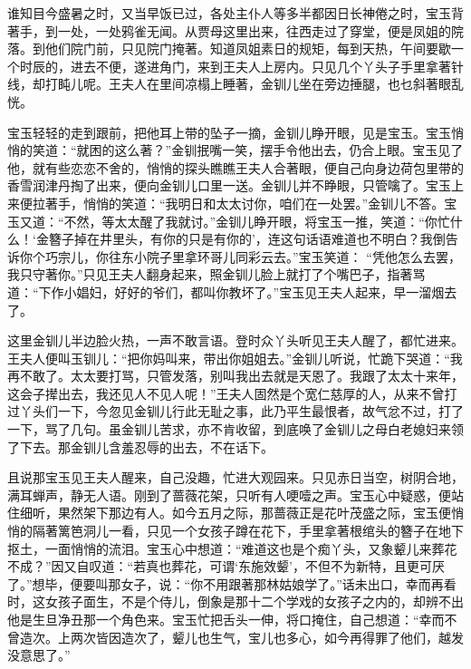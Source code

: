 \begin{parag}


    谁知目今盛暑之时，又当早饭已过，各处主仆人等多半都因日长神倦之时，宝玉背著手，到一处，一处鸦雀无闻。从贾母这里出来，往西走过了穿堂，便是凤姐的院落。到他们院门前，只见院门掩著。知道凤姐素日的规矩，每到天热，午间要歇一个时辰的，进去不便，遂进角门，来到王夫人上房内。只见几个丫头子手里拿著针线，却打盹儿呢。王夫人在里间凉榻上睡著，金钏儿坐在旁边捶腿，也乜斜著眼乱恍。
\end{parag}


\begin{parag}


    宝玉轻轻的走到跟前，把他耳上带的坠子一摘，金钏儿睁开眼，见是宝玉。宝玉悄悄的笑道：“就困的这么著？”金钏抿嘴一笑，摆手令他出去，仍合上眼。宝玉见了他，就有些恋恋不舍的，悄悄的探头瞧瞧王夫人合著眼，便自己向身边荷包里带的香雪润津丹掏了出来，便向金钏儿口里一送。金钏儿并不睁眼，只管噙了。宝玉上来便拉著手，悄悄的笑道：“我明日和太太讨你，咱们在一处罢。”金钏儿不答。宝玉又道：“不然，等太太醒了我就讨。”金钏儿睁开眼，将宝玉一推，笑道：“你忙什么！‘金簪子掉在井里头，有你的只是有你的’，连这句话语难道也不明白？我倒告诉你个巧宗儿，你往东小院子里拿环哥儿同彩云去。”宝玉笑道： “凭他怎么去罢，我只守著你。”只见王夫人翻身起来，照金钏儿脸上就打了个嘴巴子，指著骂道：“下作小娼妇，好好的爷们，都叫你教坏了。”宝玉见王夫人起来，早一溜烟去了。
\end{parag}


\begin{parag}


    这里金钏儿半边脸火热，一声不敢言语。登时众丫头听见王夫人醒了，都忙进来。王夫人便叫玉钏儿：“把你妈叫来，带出你姐姐去。”金钏儿听说，忙跪下哭道：“我再不敢了。太太要打骂，只管发落，别叫我出去就是天恩了。我跟了太太十来年，这会子撵出去，我还见人不见人呢！”王夫人固然是个宽仁慈厚的人，从来不曾打过丫头们一下，今忽见金钏儿行此无耻之事，此乃平生最恨者，故气忿不过，打了一下，骂了几句。虽金钏儿苦求，亦不肯收留，到底唤了金钏儿之母白老媳妇来领了下去。那金钏儿含羞忍辱的出去，不在话下。
\end{parag}


\begin{parag}


    且说那宝玉见王夫人醒来，自己没趣，忙进大观园来。只见赤日当空，树阴合地，满耳蝉声，静无人语。刚到了蔷薇花架，只听有人哽噎之声。宝玉心中疑惑，便站住细听，果然架下那边有人。如今五月之际，那蔷薇正是花叶茂盛之际，宝玉便悄悄的隔著篱笆洞儿一看，只见一个女孩子蹲在花下，手里拿著根绾头的簪子在地下抠土，一面悄悄的流泪。宝玉心中想道：“难道这也是个痴丫头，又象颦儿来葬花不成？”因又自叹道：“若真也葬花，可谓‘东施效颦’，不但不为新特，且更可厌了。”想毕，便要叫那女子，说：“你不用跟著那林姑娘学了。”话未出口，幸而再看时，这女孩子面生，不是个侍儿，倒象是那十二个学戏的女孩子之内的，却辨不出他是生旦净丑那一个角色来。宝玉忙把舌头一伸，将口掩住，自己想道：“幸而不曾造次。上两次皆因造次了，颦儿也生气，宝儿也多心，如今再得罪了他们，越发没意思了。”
\end{parag}


